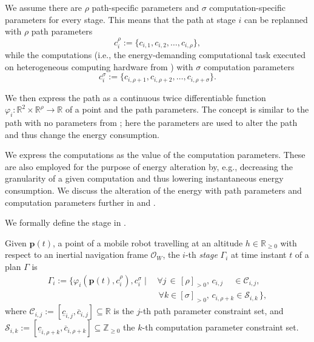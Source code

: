 We assume there are $\rho$ path-specific parameters and $\sigma$ computation-specific parameters for every stage. This means that the path at stage $i$ can be replanned with $\rho$ path parameters
\begin{equation}\label{eq:path-params}
    c_i^\rho:=\{c_{i,1},c_{i,2},\dots,c_{i,\rho}\},
\end{equation}
while the computations (i.e., the energy-demanding computational task executed on heterogeneous computing hardware from ) with $\sigma$ computation parameters 
\begin{equation}\label{eq:comp-params}
    c_i^\sigma:=\{c_{i,\rho+1},c_{i,\rho+2},\dots,c_{i,\rho+\sigma}\}.
\end{equation}

We then express the path as a continuous twice differentiable function $\varphi_i:\mathbb{R}^2\times\mathbb{R}^\rho\rightarrow\mathbb{R}$ of a point and the path parameters. The concept is similar to the path with no parameters from ; here the parameters are used to alter the path and thus change the energy consumption. 

We express the computations as the value of the computation parameters. These are also employed for the purpose of energy alteration by, e.g., decreasing the granularity of a given computation and thus lowering instantaneous energy consumption. We discuss the alteration of the energy with path parameters and computation parameters further in  and .

We formally define the stage in .

\begin{highlight}  
  \begin{defn}[Stage]\label{def:stage}
    Given $\mathbf{p}(t)$, a point of a mobile robot travelling at an altitude $h\in\mathbb{R}_{\geq 0}$ with respect to an inertial navigation frame $\mathcal{O}_W$, the $i$-th \emph{stage} $\Gamma_i$ at time instant $t$ of a plan $\Gamma$ is
    \begin{equation*}\begin{split}
      \Gamma_i:=\{\varphi_i(\mathbf{p}(t),c_i^\rho),c_i^\sigma\mid
      \,&\forall j\,\in\,[\rho]_{>0},\,c_{i,j}\,\,\,\,\,\,\,\in\mathcal{C}_{i,j},\,\\
        &\,\forall k\in[\sigma]_{>0},\,c_{i,\rho+k}\in\mathcal{S}_{i,k}\,\},
    \end{split}\end{equation*}
    where $\mathcal{C}_{i,j}:=[\underline{c}_{i,j},\overline{c}_{i,j}]\subseteq\mathbb{R}$ is the $j$-th path parameter constraint set, and $\mathcal{S}_{i,k}:=[\underline{c}_{i,\rho+k},\overline{c}_{i,\rho+k}]\subseteq\mathbb{Z}_{\geq 0}$ the $k$-th computation parameter constraint set.
  \end{defn}
\end{highlight}

